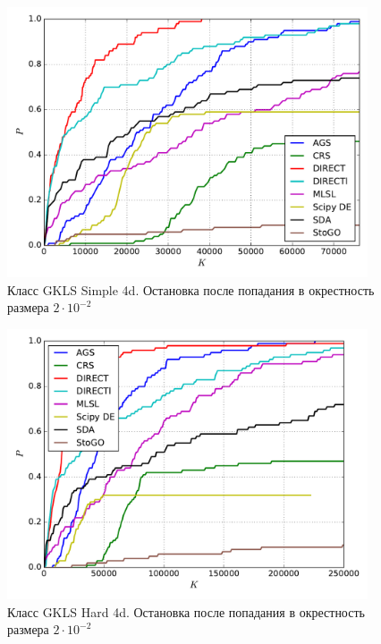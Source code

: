 \documentclass[a4paper]{article}
\begin{document}
\begin{figure}[H]
  \center
  \includegraphics[width=0.95\textwidth]{../experiments/gklss4d/cmc.pdf}
  \caption{Класс GKLS Simple 4d. Остановка после попадания в окрестность размера $2\cdot10^{-2}$}
  \label{fig:}
\end{figure}


\begin{figure}[H]
  \center
  \includegraphics[width=0.95\textwidth]{../experiments/gklsh4d/cmc.pdf}
  \caption{Класс GKLS Hard 4d. Остановка после попадания в окрестность размера $2\cdot10^{-2}$}
  \label{fig:}
\end{figure}

\end{document}
